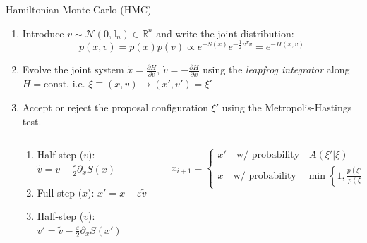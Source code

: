 \documentclass[final]{beamer}
\newlength{\sepwidth}
\newlength{\colwidth}
\newcommand{\separatorcolumn}{\begin{column}{\sepwidth}\end{column}}
\begin{document}
\begin{frame}[t]
\begin{columns}[t]
\begin{column}{\colwidth}
\begin{alertblock}{Hamiltonian Monte Carlo (HMC)}
      \begin{enumerate}
        \item Introduce \(v \sim \mathcal{N}(0, \mathbb{I}_{n})\in \mathbb{R}^{n}\) and write the joint distribution:
          \begin{equation}
            p(x, v) = p(x) p(v)\propto e^{-S(x)}e^{-\frac{1}{2}v^{T}v} = e^{-H(x, v)}
          \end{equation}
        \item Evolve the joint system \(\dot x = \frac{\partial H}{\partial v}\), \(\dot v = -\frac{\partial
          H}{\partial x}\) using the \emph{leapfrog integrator} along \(H = \mathrm{const}\), i.e. \(\xi \equiv (x,
          v)\rightarrow (x', v') = \xi'\)
        \item Accept or reject the proposal configuration \(\xi'\) using the Metropolis-Hastings test.
      \end{enumerate}

  \begin{columns}[t]
    \separatorcolumn
    \begin{column}{0.35\columnwidth}
      \begin{enumerate}
        \item Half-step (\(v\)): \(\tilde v = v - \frac{\varepsilon}{2}\partial_{x} S(x)\)
        \item Full-step (\(x\)): \(x' = x + \varepsilon \tilde v\)
        \item Half-step (\(v\)): \(v' = \tilde v - \frac{\varepsilon}{2} \partial_{x} S(x')\)
      \end{enumerate}
    \end{column}

    \begin{column}{0.65\columnwidth}
      \begin{equation*}
        x_{i+1} = \begin{cases}
          x'\quad\text{w/ probability}\quad A(\xi'|\xi)\\
          x\quad\text{w/ probability}\quad \min\left\{1,\frac{p(\xi')}{p(\xi)}\left|\frac{\partial \xi'}{\partial
          \xi^{T}}\right|\right\}
        \end{cases}
      \end{equation*}
    \end{column}
  \end{columns}




\end{alertblock}
\end{column}
\end{columns}
\end{frame}
\end{document}
